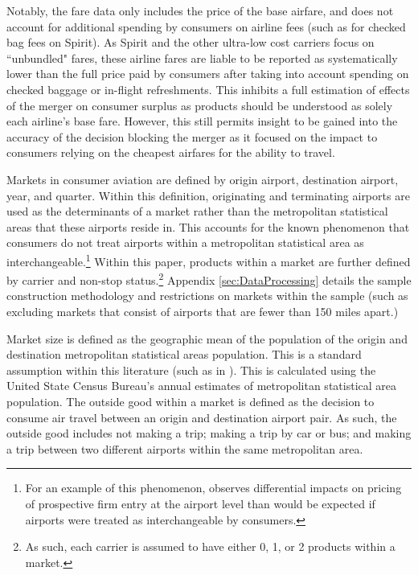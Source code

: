 \documentclass{article}
\begin{document}
    Notably, the fare data only includes the price of the base airfare, and does not account for additional spending by consumers on airline fees (such as for checked bag fees on Spirit). As Spirit and the other ultra-low cost carriers focus on ``unbundled" fares, these airline fares are liable to be reported as systematically lower than the full price paid by consumers after taking into account spending on checked baggage or in-flight refreshments. This inhibits a full estimation of effects of the merger on consumer surplus as products should be understood as solely each airline's base fare. However, this still permits insight to be gained into the accuracy of the decision blocking the merger as it focused on the impact to consumers relying on the cheapest airfares for the ability to travel. 
	
	 Markets in consumer aviation are defined by origin airport, destination airport, year, and quarter. Within this definition, originating and terminating airports are used as the determinants of a market rather than the metropolitan statistical areas that these airports reside in. This accounts for the known phenomenon that consumers do not treat airports within a metropolitan statistical area as interchangeable.\footnote{For an example of this phenomenon, \citet{goolsbee_how_2008} observes differential impacts on pricing of prospective firm entry at the airport level than would be expected if airports were treated as interchangeable by consumers.} Within this paper, products within a market are further defined by carrier and non-stop status.\footnote{As such, each carrier is assumed to have either 0, 1, or 2 products within a market.} Appendix \ref{sec:DataProcessing} details the sample construction methodology and restrictions on markets within the sample (such as excluding markets that consist of airports that are fewer than 150 miles apart.)
	
	Market size is defined as the geographic mean of the population of the origin and destination metropolitan statistical areas population. This is a standard assumption within this literature (such as in \citep{ciliberto_market_2021}). This is calculated using the United State Census Bureau's annual estimates of metropolitan statistical area population. The outside good within a market is defined as the decision to consume air travel between an origin and destination airport pair. As such, the outside good includes not making a trip; making a trip by car or bus; and making a trip between two different airports within the same metropolitan area. 
\end{document}
